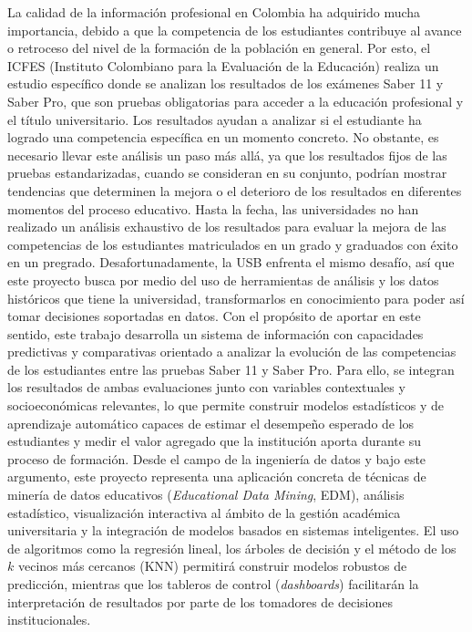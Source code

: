 La calidad de la información profesional en Colombia ha adquirido mucha importancia, debido a que la competencia de los estudiantes contribuye al avance o retroceso del nivel de la formación de la población en general. Por esto, el ICFES (Instituto Colombiano para la Evaluación de la Educación) realiza un estudio específico donde se analizan los resultados de los exámenes Saber 11 y Saber Pro, que son pruebas obligatorias para acceder a la educación profesional y el título universitario.
Los resultados ayudan a analizar si el estudiante ha logrado una competencia específica en un momento concreto. No obstante, es necesario llevar este análisis un paso más allá, ya que los resultados fijos de las pruebas estandarizadas, cuando se consideran en su conjunto, podrían mostrar tendencias que determinen la mejora o el deterioro de los resultados en diferentes momentos del proceso educativo. Hasta la fecha, las universidades no han realizado un análisis exhaustivo de los resultados para evaluar la mejora de las competencias de los estudiantes matriculados en un grado y graduados con éxito en un pregrado. Desafortunadamente, la USB enfrenta el mismo desafío, así que este proyecto busca por medio del uso de herramientas de análisis y los datos históricos que tiene la universidad, transformarlos en conocimiento para poder así tomar decisiones soportadas en datos.
Con el propósito de aportar en este sentido, este trabajo desarrolla un sistema de información con capacidades predictivas y comparativas orientado a analizar la evolución de las competencias de los estudiantes entre las pruebas Saber 11 y Saber Pro. Para ello, se integran los resultados de ambas evaluaciones junto con variables contextuales y socioeconómicas relevantes, lo que permite construir modelos estadísticos y de aprendizaje automático capaces de estimar el desempeño esperado de los estudiantes y medir el valor agregado que la institución aporta durante su proceso de formación.
Desde el campo de la ingeniería de datos y bajo este argumento, este proyecto representa una aplicación concreta de técnicas de minería de datos educativos (\textit{Educational Data Mining}, EDM), análisis estadístico, visualización interactiva al ámbito de la gestión académica universitaria y la integración de modelos basados en sistemas inteligentes. El uso de algoritmos como la regresión lineal, los árboles de decisión y el método de los $k$ vecinos más cercanos (KNN) permitirá construir modelos robustos de predicción, mientras que los tableros de control (\textit{dashboards}) facilitarán la interpretación de resultados por parte de los tomadores de decisiones institucionales.
